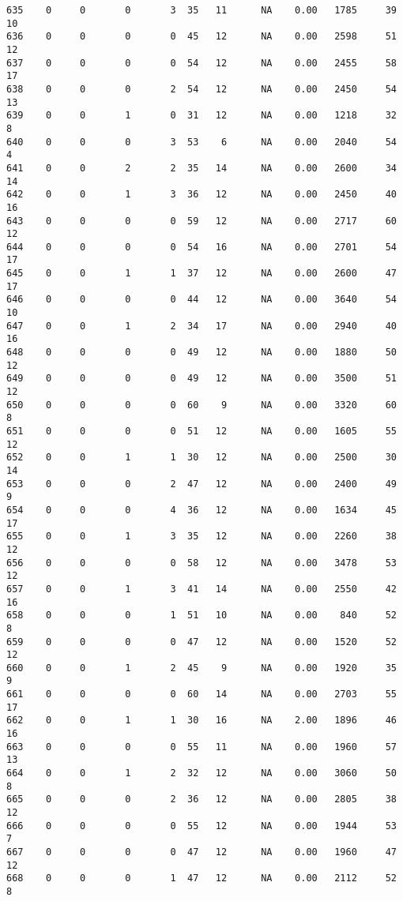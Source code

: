 \documentclass[
  letterpaper,
  DIV=11,
  numbers=noendperiod]{scrreprt}
\begin{document}
\begin{verbatim}
635    0     0       0       3  35   11      NA    0.00   1785     39      10
636    0     0       0       0  45   12      NA    0.00   2598     51      12
637    0     0       0       0  54   12      NA    0.00   2455     58      17
638    0     0       0       2  54   12      NA    0.00   2450     54      13
639    0     0       1       0  31   12      NA    0.00   1218     32       8
640    0     0       0       3  53    6      NA    0.00   2040     54       4
641    0     0       2       2  35   14      NA    0.00   2600     34      14
642    0     0       1       3  36   12      NA    0.00   2450     40      16
643    0     0       0       0  59   12      NA    0.00   2717     60      12
644    0     0       0       0  54   16      NA    0.00   2701     54      17
645    0     0       1       1  37   12      NA    0.00   2600     47      17
646    0     0       0       0  44   12      NA    0.00   3640     54      10
647    0     0       1       2  34   17      NA    0.00   2940     40      16
648    0     0       0       0  49   12      NA    0.00   1880     50      12
649    0     0       0       0  49   12      NA    0.00   3500     51      12
650    0     0       0       0  60    9      NA    0.00   3320     60       8
651    0     0       0       0  51   12      NA    0.00   1605     55      12
652    0     0       1       1  30   12      NA    0.00   2500     30      14
653    0     0       0       2  47   12      NA    0.00   2400     49       9
654    0     0       0       4  36   12      NA    0.00   1634     45      17
655    0     0       1       3  35   12      NA    0.00   2260     38      12
656    0     0       0       0  58   12      NA    0.00   3478     53      12
657    0     0       1       3  41   14      NA    0.00   2550     42      16
658    0     0       0       1  51   10      NA    0.00    840     52       8
659    0     0       0       0  47   12      NA    0.00   1520     52      12
660    0     0       1       2  45    9      NA    0.00   1920     35       9
661    0     0       0       0  60   14      NA    0.00   2703     55      17
662    0     0       1       1  30   16      NA    2.00   1896     46      16
663    0     0       0       0  55   11      NA    0.00   1960     57      13
664    0     0       1       2  32   12      NA    0.00   3060     50       8
665    0     0       0       2  36   12      NA    0.00   2805     38      12
666    0     0       0       0  55   12      NA    0.00   1944     53       7
667    0     0       0       0  47   12      NA    0.00   1960     47      12
668    0     0       0       1  47   12      NA    0.00   2112     52       8

\end{verbatim}
\end{document}
